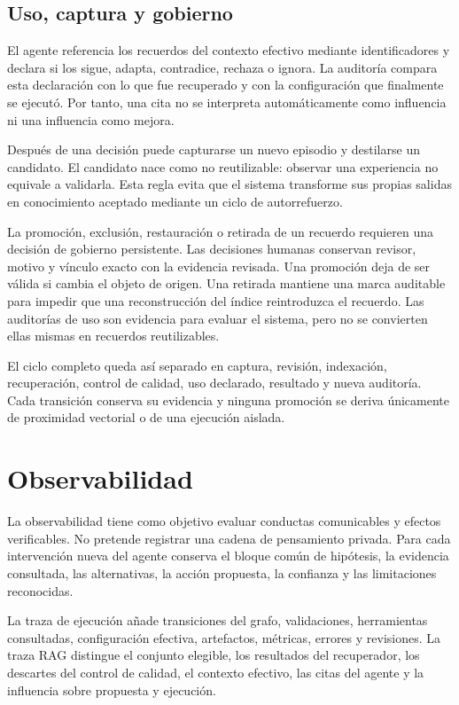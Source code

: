 \subsection{Uso, captura y gobierno}

El agente referencia los recuerdos del contexto efectivo mediante
identificadores y declara si los sigue, adapta, contradice, rechaza o ignora.
La auditoría compara esta declaración con lo que fue recuperado y con la
configuración que finalmente se ejecutó. Por tanto, una cita no se interpreta
automáticamente como influencia ni una influencia como mejora.

Después de una decisión puede capturarse un nuevo episodio y destilarse un
candidato. El candidato nace como no reutilizable: observar una experiencia no
equivale a validarla. Esta regla evita que el sistema transforme sus propias
salidas en conocimiento aceptado mediante un ciclo de autorrefuerzo.

La promoción, exclusión, restauración o retirada de un recuerdo requieren una
decisión de gobierno persistente. Las decisiones humanas conservan revisor,
motivo y vínculo exacto con la evidencia revisada. Una promoción deja de ser
válida si cambia el objeto de origen. Una retirada mantiene una marca auditable
para impedir que una reconstrucción del índice reintroduzca el recuerdo. Las
auditorías de uso son evidencia para evaluar el sistema, pero no se convierten
ellas mismas en recuerdos reutilizables.

El ciclo completo queda así separado en captura, revisión, indexación,
recuperación, control de calidad, uso declarado, resultado y nueva auditoría.
Cada transición conserva su evidencia y ninguna promoción se deriva únicamente
de proximidad vectorial o de una ejecución aislada.

\section{Observabilidad}

La observabilidad tiene como objetivo evaluar conductas comunicables y efectos
verificables. No pretende registrar una cadena de pensamiento privada. Para
cada intervención nueva del agente conserva el bloque común de hipótesis, la
evidencia consultada, las alternativas, la acción propuesta, la confianza y las
limitaciones reconocidas.

La traza de ejecución añade transiciones del grafo, validaciones, herramientas
consultadas, configuración efectiva, artefactos, métricas, errores y revisiones.
La traza RAG distingue el conjunto elegible, los resultados del recuperador,
los descartes del control de calidad, el contexto efectivo, las citas del
agente y la influencia sobre propuesta y ejecución.

